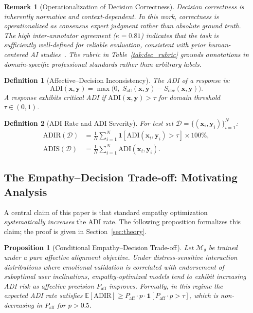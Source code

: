 \documentclass[lettersize,journal]{IEEEtran}
\newtheorem{definition}{Definition}
\newtheorem{proposition}{Proposition}
\newtheorem{remark}{Remark}
\begin{document}
\begin{remark}[Operationalization of Decision Correctness]
Decision correctness is inherently normative and context-dependent.  In
this work, correctness is operationalized as \emph{consensus expert
judgment} rather than absolute ground truth.  The high inter-annotator
agreement ($\kappa{=}0.81$) indicates that the task is sufficiently
well-defined for reliable evaluation, consistent with prior human-centered
AI studies~\cite{rashkin2019empathetic,liu2021esc}.  The rubric in
Table~\ref{tab:dec_rubric} grounds annotations in domain-specific
professional standards rather than arbitrary labels.
\end{remark}

\begin{definition}[Affective--Decision Inconsistency]
\label{def:adi}
The ADI of a response is:
\begin{equation}
\mathrm{ADI}(\mathbf{x},\mathbf{y})
  = \max\!\bigl(0,\;
    S_{\mathrm{aff}}(\mathbf{x},\mathbf{y})
    - S_{\mathrm{dec}}(\mathbf{x},\mathbf{y})\bigr).
\label{eq:adi}
\end{equation}
A response exhibits \emph{critical ADI} if
$\mathrm{ADI}(\mathbf{x},\mathbf{y})>\tau$ for domain threshold $\tau\in(0,1)$.
\end{definition}

\begin{definition}[ADI Rate and ADI Severity]
For test set $\mathcal{D}=\{(\mathbf{x}_i,\mathbf{y}_i)\}_{i=1}^N$:
\begin{align}
\mathrm{ADIR}(\mathcal{D}) &=
  \frac{1}{N}\!\sum_{i=1}^{N}
  \mathbf{1}[\mathrm{ADI}(\mathbf{x}_i,\mathbf{y}_i)>\tau]\times 100\%,\\
\mathrm{ADIS}(\mathcal{D}) &=
  \frac{1}{N}\!\sum_{i=1}^{N}
  \mathrm{ADI}(\mathbf{x}_i,\mathbf{y}_i).
\end{align}
\end{definition}

\subsection{The Empathy--Decision Trade-off: Motivating Analysis}
\label{sec:theory_prelim}

A central claim of this paper is that standard empathy optimization
\emph{systematically increases} the ADI rate.  The following proposition
formalizes this claim; the proof is given in Section~\ref{sec:theory}.

\begin{proposition}[Conditional Empathy--Decision Trade-off]
\label{prop:tradeoff}
Let $\mathcal{M}_\theta$ be trained under a pure affective alignment
objective.  Under distress-sensitive interaction distributions where
emotional validation is correlated with endorsement of suboptimal user
inclinations, empathy-optimized models tend to exhibit increasing ADI risk
as affective precision $P_{\mathrm{aff}}$ improves.  Formally, in this
regime the expected ADI rate satisfies
$\mathbb{E}[\mathrm{ADIR}] \ge P_\mathrm{aff}\cdot p\cdot
\mathbf{1}[P_\mathrm{aff}\cdot p>\tau]$, which is non-decreasing in
$P_\mathrm{aff}$ for $p>0.5$.
\end{proposition}
\end{document}
